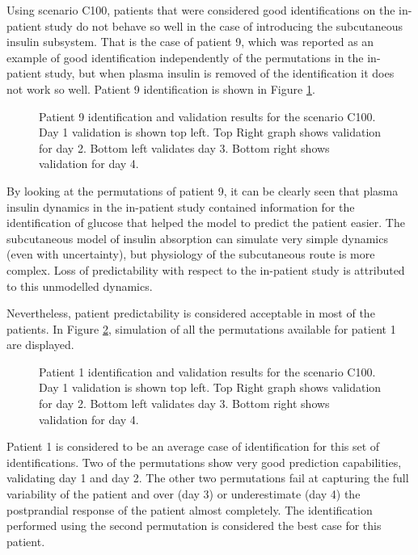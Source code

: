 Using scenario C100, patients that were considered good identifications on the in-patient study do not behave so well in the case of introducing the subcutaneous insulin subsystem. That is the case of patient 9, which was reported as an example of good identification independently of the permutations in the in-patient study, but when plasma insulin is removed of the identification it does not work so well. Patient 9 identification is shown in Figure \ref{fig:ysiscinspatient9}.

\begin{figure}[hbt]
\centering
{}\caption{Patient 9 identification and validation results for the scenario C100. Day 1 validation is shown top left. Top Right graph shows validation for day 2. Bottom left validates day 3. Bottom right shows validation for day 4.}
\label{fig:ysiscinspatient9}
\end{figure}

By looking at the permutations of patient 9, it can be clearly seen that plasma insulin dynamics in the in-patient study contained information for the identification of glucose that helped the model to predict the patient easier. The subcutaneous model of insulin absorption can simulate very simple dynamics (even with uncertainty), but physiology of the subcutaneous route is more complex. Loss of predictability with respect to the in-patient study is attributed to this unmodelled dynamics.

Nevertheless, patient predictability is considered acceptable in most of the patients. In Figure \ref{fig:ysiscinspatient1}, simulation of all the permutations available for patient 1 are displayed.

\begin{figure}[hbt]
\centering
{}\caption{Patient 1 identification and validation results for the scenario C100. Day 1 validation is shown top left. Top Right graph shows validation for day 2. Bottom left validates day 3. Bottom right shows validation for day 4.}
\label{fig:ysiscinspatient1}
\end{figure}

Patient 1 is considered to be an average case of identification for this set of identifications. Two of the permutations show very good prediction capabilities, validating day 1 and day 2. The other two permutations fail at capturing the full variability of the patient and over (day 3) or underestimate (day 4) the postprandial response of the patient almost completely. The identification performed using the second permutation is considered the best case for this patient.

